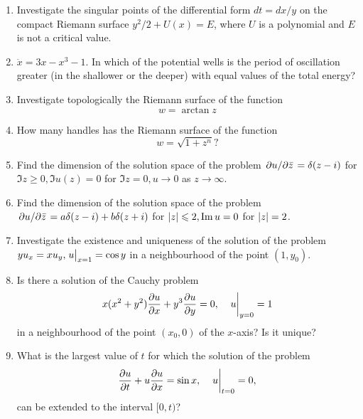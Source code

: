 \documentclass{article}
\begin{document}
\begin{enumerate}
\item Investigate the singular points of the differential form $dt = dx/y$ on the compact Riemann surface $y^2/2 + U(x) = E$, where $U$ is a polynomial and $E$ is not a critical value.

\item $\ddot x = 3x-x^3-1$. In which of the potential wells is the period of oscillation greater (in the shallower or the deeper) with equal values of the total energy?

\item Investigate topologically the Riemann surface of the function
  \begin{equation*}
    w = \arctan z
  \end{equation*}

\item How many handles has the Riemann surface of the function
  \begin{equation*}
    w = \sqrt{1 + z^n} ?
  \end{equation*}

\item Find the dimension of the solution space of the problem $\pdv*{u}{\bar z} = \delta(z - i)$ for $\Im z \geqslant 0, \Im u(z) = 0$ for $\Im z = 0, u \to 0$ as $z \to \infty$.

\item Find the dimension of the solution space of the problem $\pdv*{u}{\bar z} = a\delta(z - i) + b\delta(z+i)$ for $\abs{z} \leqslant 2, \Im u = 0$ for $\abs{z} = 2$.

\item Investigate the existence and uniqueness of the solution of the problem $yu_x = xu_y, \eval{u}_{x=1} = \cos y$ in a neighbourhood of the point $(1, y_0)$.

\item Is there a solution of the Cauchy problem
  \begin{equation*}
    x(x^2 + y^2)\pdv{u}{x} + y^3\pdv{u}{y} = 0, \quad \eval{u}_{y=0} = 1
  \end{equation*}
  in a neighbourhood of the point $(x_0, 0)$ of the $x$-axis? Is it unique?

\item What is the largest value of $t$ for which the solution of the problem
  \begin{equation*}
    \pdv{u}{t} + u\pdv{u}{x} = \sin x, \quad \eval{u}_{t=0} = 0,
  \end{equation*}
  can be extended to the interval $[0, t)$?


\end{enumerate}
\end{document}
